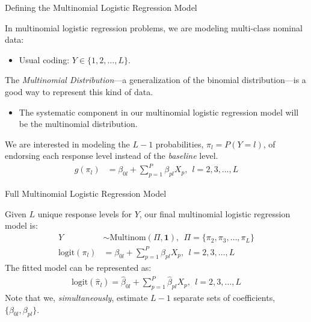 \documentclass{beamer}\usepackage[]{graphicx}\usepackage[]{color}
\newcommand{\bup}{\boldsymbol{\betaup}}
\begin{document}
\begin{frame}{Defining the Multinomial Logistic Regression Model}
  
  In multinomial logistic regression problems, we are modeling multi-class 
  nominal data:
  \vb
  \begin{itemize}
  \item Usual coding: $Y \in \{1, 2, \ldots, L\}$.
  \end{itemize}
  \vb 
  The \emph{Multinomial Distribution}---a generalization of the binomial 
  distribution---is a good way to represent this kind of data.
  \vb
  \begin{itemize}
  \item The systematic component in our multinomial logistic regression model 
    will be the multinomial distribution.
  \end{itemize}
  \vb
  We are interested in modeling the $L - 1$ probabilities, $\pi_l = P(Y = l)$, 
  of endorsing each response level instead of the \emph{baseline} level.
  \begin{align*}
    g(\pi_l) &= \beta_{0l} + \sum_{p = 1}^P \beta_{pl} X_p, ~~ l = 2, 3, \ldots, L%
  \end{align*}

\end{frame}


\begin{frame}{Full Multinomial Logistic Regression Model}
  
  Given $L$ unique response levels for $Y$, our final multinomial logistic 
  regression model is:
  \begin{align*}
    Y &\sim \text{Multinom}(\Pi, \mathbf{1}), ~~ \Pi = \{\pi_2, \pi_3, \ldots, 
    \pi_L\}\\
    \text{logit}(\pi_l) &= \beta_{0l} + \sum_{p = 1}^P \beta_{pl} X_p, ~~ l = 2, 3,
    \ldots, L
  \end{align*}
  The fitted model can be represented as:
  \begin{align*}
    \text{logit}(\hat{\pi}_l) = \hat{\beta}_{0l} + \sum_{p = 1}^P \hat{\beta}_{pl} 
    X_p, ~~ l = 2, 3, \ldots, L
  \end{align*}
  Note that we, \emph{simultaneously}, estimate $L - 1$ separate sets of 
  coefficients, $\{\beta_{0l}, \beta_{pl}\}$.   
  
\end{frame}
\end{document}
